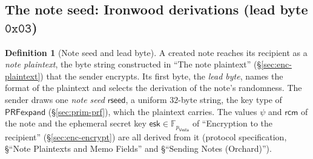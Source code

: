 \documentclass[11pt,a4paper]{article}
\theoremstyle{definition}
\newtheorem{definition}[theorem]{Definition}
\newcommand{\F}{\mathbb{F}}
\newcommand{\Vesta}{\ensuremath{\mathsf{Vesta}}}
\newcommand{\rcm}{\ensuremath{\mathsf{rcm}}}
\begin{document}
\subsection{The note seed: Ironwood derivations (lead byte
\texorpdfstring{$\mathtt{0x03}$}{0x03})}\label{sec:notes-seed}

\begin{definition}[Note seed and lead byte]
A created note reaches its recipient as a \emph{note plaintext}, the byte
string constructed in ``The note plaintext'' (\S\ref{sec:enc-plaintext}) that
the sender encrypts. Its first byte, the \emph{lead byte}, names the format
of the plaintext and selects the derivation of the note's randomness. The
sender draws one \emph{note seed} $\mathsf{rseed}$, a uniform $32$-byte
string, the key type of $\mathsf{PRFexpand}$ (\S\ref{sec:prim-prf}), which
the plaintext carries. The values $\psi$ and $\rcm$ of the note and the
ephemeral secret key $\mathsf{esk} \in \F_{p_{\Vesta}}$ of ``Encryption to
the recipient'' (\S\ref{sec:enc-encrypt}) are all derived from it (protocol
specification, \S``Note Plaintexts and Memo Fields'' and \S``Sending Notes
(Orchard)'').
\end{definition}
\end{document}
